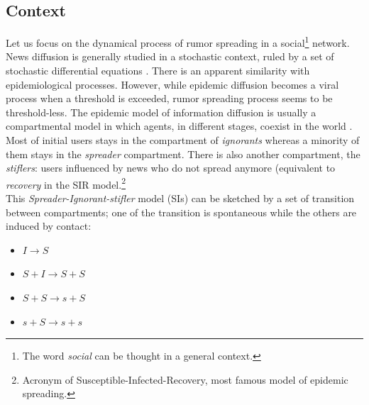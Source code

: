 \subsection{Context}
Let us focus on the dynamical process of rumor spreading in a social\footnote{The word \textit{social} can be thought in a general context.} network.
\\ News diffusion is generally studied in a stochastic context, ruled by a set of stochastic differential equations \cite{chen2013information}.
 There is an apparent similarity with epidemiological processes. 
However, while epidemic diffusion becomes a viral process when a threshold is exceeded, rumor spreading process seems to be threshold-less.
 The epidemic model of information diffusion is usually a compartmental model in which agents, in different stages, coexist in the world \cite{barrat2008dynamical}.
 Most of initial users stays in the compartment of \textit{ignorants} whereas a minority of them stays in the \textit{spreader} compartment.
 There is also another compartment, the \textit{stiflers}: users influenced by news who do not spread anymore (equivalent to \textit{recovery} in the SIR model.\footnote{Acronym of Susceptible-Infected-Recovery, most famous model of epidemic spreading.}
\\ This \textit{Spreader-Ignorant-stifler} model (SIs) can be sketched by a set of transition between compartments; one of the transition is spontaneous while the others are induced by contact:
\begin{itemize}
\item$ I \longrightarrow S$
\item $S+I \longrightarrow S + S$

\item $S + S \longrightarrow s + S$

\item $s + S \longrightarrow  s + s$
\end{itemize}

